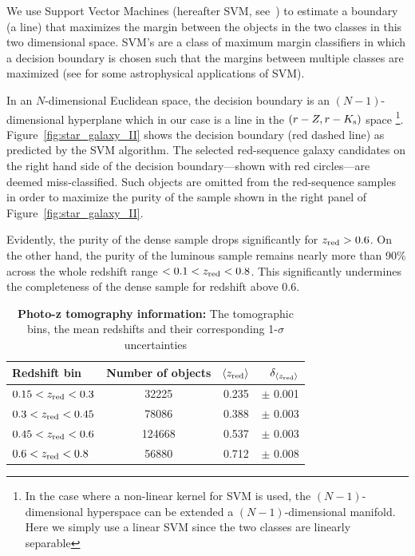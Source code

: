 \documentclass[fleqn,usenatbib,useAMS]{mnras}
\begin{document}
We use Support Vector Machines (hereafter SVM, see~\citealt{cristianini2000, scholkopf2000}) to estimate a boundary (a line) that maximizes the margin between the objects in the two classes in this two dimensional space. SVM's are a class of maximum margin  classifiers in which a decision boundary is chosen such that the margins between multiple classes are maximized (see \citealt{fadely2012, van2018} for some astrophysical applications of SVM).

In an $N$-dimensional Euclidean space, the decision boundary is an $(N-1)$-dimensional hyperplane which in our case is a line in the $(r-Z, r-K_{\rm s})$ space \footnote{In the case where a non-linear kernel for SVM is used, the $(N-1)$-dimensional hyperspace can be extended a $(N-1)$-dimensional manifold. Here we simply use a linear SVM since the two classes are linearly separable}. Figure~\ref{fig:star_galaxy_II} shows the decision boundary (red dashed line) as predicted by the SVM algorithm. The selected red-sequence galaxy candidates on the right hand side of the decision boundary---shown with red circles---are deemed miss-classified. Such objects are omitted from the red-sequence samples in order to maximize the purity of the sample shown in the right panel of Figure~\ref{fig:star_galaxy_II}. 

Evidently, the purity of the dense sample drops significantly for $z_{\rm red}>0.6$. On the other hand, the purity of the luminous sample remains nearly more than 90\% across the whole redshift range $<0.1<z_{\rm red}<0.8$. This significantly undermines the completeness of the dense sample for redshift above 0.6. 

\begin{table}
	\centering
	\caption{{\bf Photo-z tomography information:} 
    The tomographic bins, the mean redshifts and their corresponding 1-$\sigma$ uncertainties}
	
	\label{tab:pz}
	\begin{tabularx}{\columnwidth}{lccr} %
		\hline
		Redshift bin &  Number of objects & $\langle z_{\rm red} \rangle$ & $\delta_{\langle z_{\rm red} \rangle}$ \\
		\hline
		$0.15 <z_{\rm red}<0.3$  & 32225  &  0.235 & $\pm$ 0.001  \\
		$0.3  <z_{\rm red}<0.45$ & 78086  &  0.388 & $\pm$ 0.003  \\
        $0.45 <z_{\rm red}<0.6$  & 124668  &  0.537 & $\pm$ 0.003  \\
        $0.6  <z_{\rm red}<0.8$  & 56880  &  0.712 & $\pm$ 0.008  \\
		\hline
	\end{tabularx}
\end{table}
\end{document}
